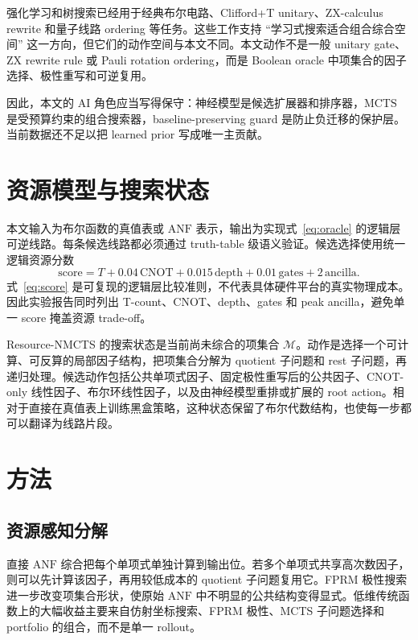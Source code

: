 \documentclass[UTF8,fontset=macnew,11pt]{ctexart}
\newcommand{\method}{Resource-NMCTS}
\newcommand{\score}{\ensuremath{\mathrm{score}}}
\newcommand{\anf}{\ensuremath{\mathrm{ANF}}}
\newcommand{\mcts}{\ensuremath{\mathrm{MCTS}}}
\begin{document}
强化学习和树搜索已经用于经典布尔电路、Clifford+T unitary、ZX-calculus rewrite 和量子线路 ordering 等任务\cite{tsaras2024shortcircuit,rietsch2024unitary,riu2025rlzx,machiya2026monteq}。这些工作支持 ``学习式搜索适合组合综合空间'' 这一方向，但它们的动作空间与本文不同。本文动作不是一般 unitary gate、ZX rewrite rule 或 Pauli rotation ordering，而是 Boolean oracle 中项集合的因子选择、极性重写和可逆复用。

因此，本文的 AI 角色应当写得保守：神经模型是候选扩展器和排序器，\mcts{} 是受预算约束的组合搜索器，baseline-preserving guard 是防止负迁移的保护层。当前数据还不足以把 learned prior 写成唯一主贡献。

\section{资源模型与搜索状态}

本文输入为布尔函数的真值表或 \anf{} 表示，输出为实现式~\eqref{eq:oracle} 的逻辑层可逆线路。每条候选线路都必须通过 truth-table 级语义验证。候选选择使用统一逻辑资源分数
\begin{equation}
  \score = T + 0.04\,\mathrm{CNOT} + 0.015\,\mathrm{depth}
         + 0.01\,\mathrm{gates} + 2\,\mathrm{ancilla}.
  \label{eq:score}
\end{equation}
式~\eqref{eq:score} 是可复现的逻辑层比较准则，不代表具体硬件平台的真实物理成本。因此实验报告同时列出 T-count、CNOT、depth、gates 和 peak ancilla，避免单一 score 掩盖资源 trade-off。

\method{} 的搜索状态是当前尚未综合的项集合 $\mathcal{M}$。动作是选择一个可计算、可反算的局部因子结构，把项集合分解为 quotient 子问题和 rest 子问题，再递归处理。候选动作包括公共单项式因子、固定极性重写后的公共因子、CNOT-only 线性因子、布尔环线性因子，以及由神经模型重排或扩展的 root action。相对于直接在真值表上训练黑盒策略，这种状态保留了布尔代数结构，也使每一步都可以翻译为线路片段。

\section{方法}

\subsection{资源感知分解}

直接 \anf{} 综合把每个单项式单独计算到输出位。若多个单项式共享高次数因子，则可以先计算该因子，再用较低成本的 quotient 子问题复用它。FPRM 极性搜索进一步改变项集合形状，使原始 \anf{} 中不明显的公共结构变得显式。低维传统函数上的大幅收益主要来自仿射坐标搜索、FPRM 极性、MCTS 子问题选择和 portfolio 的组合，而不是单一 rollout。
\end{document}
